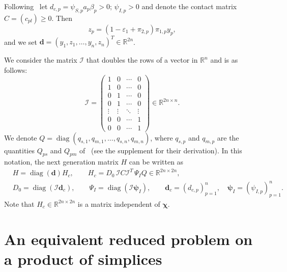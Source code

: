 \documentclass[11pt]{article}
\theoremstyle{plain}
\theoremstyle{remark}
\numberwithin{equation}{section}
\begin{document}
Following~\cite[Section~2.1 and Appendix A]{2026Feng_Day_Glasser} let $d_{c,p}=\psi_{S,p}a_p\beta_p>0$; $\psi_{I,p}>0$ and denote the contact matrix $C=(c_{pl})\ge 0$. Then
\begin{equation}\label{yz}
z_p=\left(1-\varepsilon_1+\pi_{2,p}\right)\pi_{1,p}y_p,
\end{equation}
and we set $\bm d=(y_1,z_1,\ldots,y_n,z_n)^T\in\mathbb{R}^{2n}$.

We consider the matrix $\mathcal{I}$ that doubles the rows of a vector in $\mathbb{R}^n$ and is as follows:
\begin{equation}\label{dup}
\mathcal{I}=
\begin{pmatrix}
1&0&\cdots&0\\
1&0&\cdots&0\\
0&1&\cdots&0\\
0&1&\cdots&0\\
\vdots&\vdots&\ddots&\vdots\\
0&0&\cdots&1\\
0&0&\cdots&1
\end{pmatrix}\in\mathbb{R}^{2n\times n}.
\end{equation}
We denote
$Q=\operatorname{diag}\left(q_{s,1},q_{m,1},\ldots,q_{s,n},q_{m,n}\right)$, where
$q_{s,p}$ and $q_{m,p}$ are the quantities $Q_{ps}$ and $Q_{pm}$
of~\cite[Appendix~A]{2026Feng_Day_Glasser} (see the supplement for their derivation).
In this notation, the next generation matrix $H$ can be written as
\begin{equation}\label{ngm}
\begin{aligned}
&H=\operatorname{diag}(\bm d)H_c,\qquad
H_c=D_0\,\mathcal{I}C\mathcal{I}^T\,\Psi_IQ\in\mathbb{R}^{2n\times 2n},\\
&D_0=\operatorname{diag}\left(\mathcal{I}\bm d_c\right),\qquad
\Psi_I=\operatorname{diag}\left(\mathcal{I}\bm\psi_I\right),\qquad
\bm d_c=\left(d_{c,p}\right)_{p=1}^n,\quad
\bm\psi_I=\left(\psi_{I,p}\right)_{p=1}^n.
\end{aligned}
\end{equation}
Note that $H_c\in\mathbb{R}^{2n\times 2n}$ is a matrix independent of $\bm\chi$. 

\section{An equivalent reduced problem on a product of simplices}\label{sec-reduced}
\end{document}
